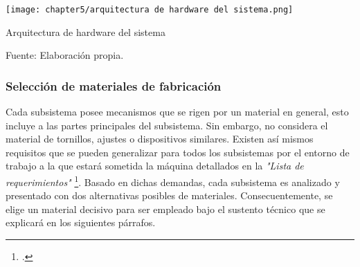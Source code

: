 \begin{myfigure}[H]
	\centering
	\texttt{[image: chapter5/arquitectura de hardware del sistema.png]}
	\caption{Arquitectura de hardware del sistema}
	\begin{myflushleftportland}
		Fuente: Elaboración propia.
	\end{myflushleftportland}
	\label{fig:arquitectura de hardware del sistema}
\end{myfigure}


\subsubsection{Selección de materiales de fabricación}
\label{sssec:seleccion de materiales de fabricacion}

Cada subsistema posee mecanismos que se rigen por un material en general, esto incluye a las partes principales del subsistema. Sin embargo, no considera el material de tornillos, ajustes o dispositivos similares. Existen así mismos requisitos que se pueden generalizar para todos los subsistemas por el entorno de trabajo a la que estará sometida la máquina detallados en la \textit{"Lista de requerimientos"} \footnote{\cite{DiazVergara2020}.}. Basado en dichas demandas, cada subsistema es analizado y presentado con dos alternativas posibles de materiales. Consecuentemente, se elige un material decisivo para ser empleado bajo el sustento técnico que se explicará en los siguientes párrafos.

